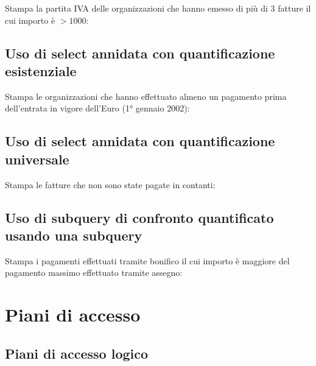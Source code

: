 \documentclass[a4paper,12pt]{article}
\begin{document}
Stampa la partita IVA delle organizzazioni che hanno emesso di più di 3 fatture il cui importo è $> 1000$:

\begin{minipage}{\textwidth}

\end{minipage}

 \subsection{ Uso di select annidata con quantificazione esistenziale }

Stampa le organizzazioni che hanno effettuato almeno un pagamento prima dell'entrata in vigore dell'Euro (1° gennaio 2002):

\begin{minipage}{\textwidth}

\end{minipage}

 \subsection{ Uso di select annidata con quantificazione universale }

Stampa le fatture che non sono state pagate in contanti:

\begin{minipage}{\textwidth}

\end{minipage}

 \subsection{ Uso di subquery di confronto quantificato usando una subquery }

Stampa i pagamenti effettuati tramite bonifico il cui importo è maggiore del pagamento massimo effettuato tramite assegno:

\begin{minipage}{\textwidth}

\end{minipage}

 \section{ Piani di accesso }

 \subsection{ Piani di accesso logico }
\end{document}

